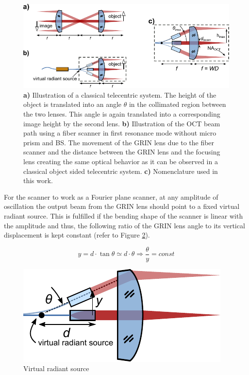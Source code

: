 \begin{figure}[h!]\centering \includegraphics[width=\columnwidth]{figures/30_DesignSimulation/fps.pdf}
      \caption{\textbf{a)} Illustration of a classical telecentric system. The height of the object is translated into an angle $\theta$ in the collimated region between the two lenses. This angle is again translated into a corresponding image height by the second lens. \textbf{b)} Illustration of the OCT beam path using a fiber scanner in first resonance mode without micro prism and BS. The movement of the GRIN lens due to the fiber scanner and the distance between the GRIN lens and the focusing lens creating the same optical behavior as it can be observed in a classical object sided telecentric system. \textbf{c)} Nomenclature used in this work.}
      \label{fig:fps}
\end{figure}

For the scanner to work as a Fourier plane scanner, at any amplitude of oscillation the output beam from the GRIN lens should point to a fixed virtual radiant source. This is fulfilled if the bending shape of the scanner is linear with the amplitude and thus, the following ratio of the GRIN lens angle to its vertical displacement is kept constant (refer to Figure \ref{fig:radiant}).

$$ y = d \cdot \tan \theta \simeq d \cdot \theta \Rightarrow \frac{\theta}{y} = const $$

\begin{figure}[h!]\centering
      \includegraphics{figures/30_DesignSimulation/Mechanical/radiant.pdf}
      \caption{Virtual radiant source}
      \label{fig:radiant}
\end{figure}

